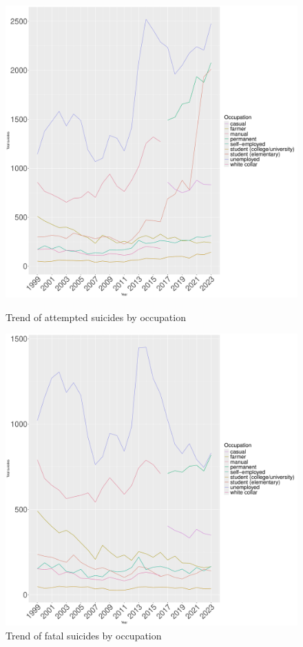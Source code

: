 \documentclass{article}
\begin{document}
\begin{figure}[H]
    \centering
    \begin{minipage}{0.45\textwidth}
        \includegraphics[width=\textwidth]{imgs/job_attempted.pdf}
        \caption{Trend of attempted suicides by occupation}
	\label{fig:job_attempted}
    \end{minipage}
    \hfill
    \begin{minipage}{0.45\textwidth}
        \includegraphics[width=\textwidth]{imgs/job_fatal.pdf}
        \caption{Trend of fatal suicides by occupation}
	\label{fig:job_fatal}
    \end{minipage}
\end{figure}
\end{document}
